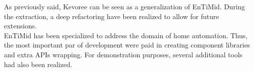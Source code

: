 As previously said, Kevoree can be seen as a generalization of EnTiMid. During the extraction, a deep refactoring have been realized to allow for future extensions.\\
EnTiMid has been specialized to address the domain of home automation. Thus, the most important par of development were paid in creating component libraries and extra APIs wrapping. For demonstration purposes, several additional tools had also been realized.


%
%
%
